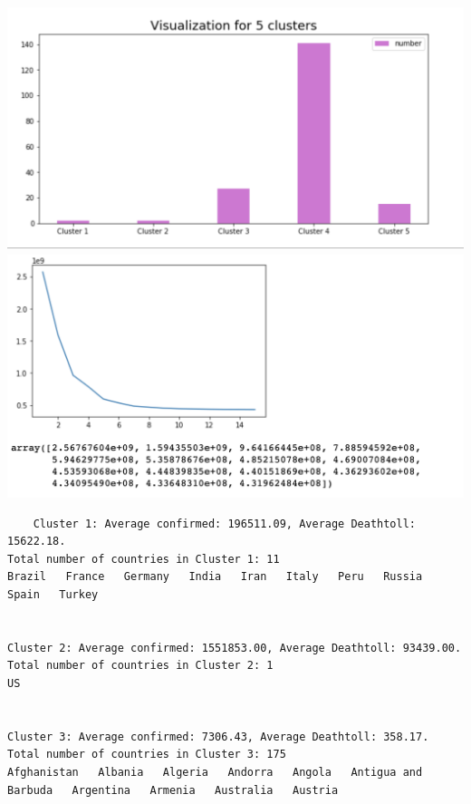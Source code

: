 \documentclass{article}
\begin{document}
\includegraphics[scale=0.75]{cluster_graph4.png} \newline
\includegraphics[scale=0.75]{matplotlib2.png}
\begin{verbatim}
    Cluster 1: Average confirmed: 196511.09, Average Deathtoll: 15622.18.
Total number of countries in Cluster 1: 11
Brazil   France   Germany   India   Iran   Italy   Peru   Russia   Spain   Turkey   


Cluster 2: Average confirmed: 1551853.00, Average Deathtoll: 93439.00.
Total number of countries in Cluster 2: 1
US   


Cluster 3: Average confirmed: 7306.43, Average Deathtoll: 358.17.
Total number of countries in Cluster 3: 175
Afghanistan   Albania   Algeria   Andorra   Angola   Antigua and Barbuda   Argentina   Armenia   Australia   Austria   
\end{verbatim}
\end{document}
